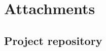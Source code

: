 \documentclass[12pt,a4paper]{report}
\begin{document}



\tableofcontents

\ifshowchanges

\fi














\listoffigures

\listoftables



\ifx\ThesisType\TypePhD
{}
\fi

\appendix
\chapter{Attachments}

\section{Project repository}
\label{att:repository}
\end{document}
